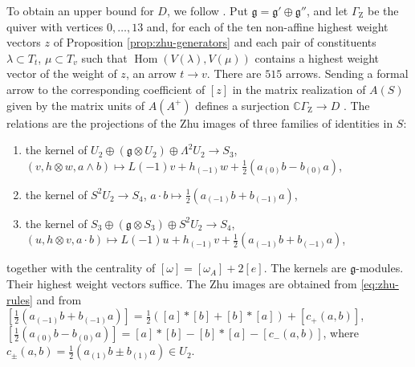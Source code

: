 \documentclass[leqno]{article}
\newcommand{\Cbb}{\ensuremath{\mathbb{C}}}
\newcommand{\ot}{\otimes}
\numberwithin{equation}{section}
\begin{document}
To obtain an upper bound for $D$, we follow \cite[Section 9]{Rie26b}. Put $\mathfrak g = \mathfrak g' \oplus \mathfrak g''$, and let $\Gamma_{\mathrm Z}$ be the quiver with vertices $0, \ldots, 13$ and, for each of the ten non-affine highest weight vectors $z$ of Proposition \ref{prop:zhu-generators} and each pair of constituents $\lambda \subset T_t$, $\mu \subset T_v$ such that $\operatorname{Hom}(V(\lambda), V(\mu))$ contains a highest weight vector of the weight of $z$, an arrow $t \to v$. There are $515$ arrows. Sending a formal arrow to the corresponding coefficient of $[z]$ in the matrix realization of $A(S)$ given by the matrix units of $A(A^+)$ defines a surjection $\Cbb\Gamma_{\mathrm Z} \to D$ \cite[Propositions 8.3 and 8.6]{Rie26b}. The relations are the projections of the Zhu images of three families of identities in $S$:
\begin{enumerate}
\item the kernel of $U_2 \oplus (\mathfrak g \ot U_2) \oplus \Lambda^2 U_2 \to S_3$, $(v, h \ot w, a \wedge b) \mapsto L(-1)v + h_{(-1)}w + \frac12(a_{(0)}b - b_{(0)}a)$,
\item the kernel of $S^2U_2 \to S_4$, $a \cdot b \mapsto \frac12(a_{(-1)}b + b_{(-1)}a)$,
\item the kernel of $S_3 \oplus (\mathfrak g \ot S_3) \oplus S^2U_2 \to S_4$, $(u, h \ot v, a \cdot b) \mapsto L(-1)u + h_{(-1)}v + \frac12(a_{(-1)}b + b_{(-1)}a)$,
\end{enumerate}
together with the centrality of $[\omega] = [\omega_A] + 2[e]$. The kernels are $\mathfrak g$-modules. Their highest weight vectors suffice. The Zhu images are obtained from \eqref{eq:zhu-rules} and from $[\frac12(a_{(-1)}b + b_{(-1)}a)] = \frac12([a]*[b] + [b]*[a]) + [c_+(a,b)]$, $[\frac12(a_{(0)}b - b_{(0)}a)] = [a]*[b] - [b]*[a] - [c_-(a,b)]$, where $c_\pm(a,b) = \frac12(a_{(1)}b \pm b_{(1)}a) \in U_2$.
\end{document}
